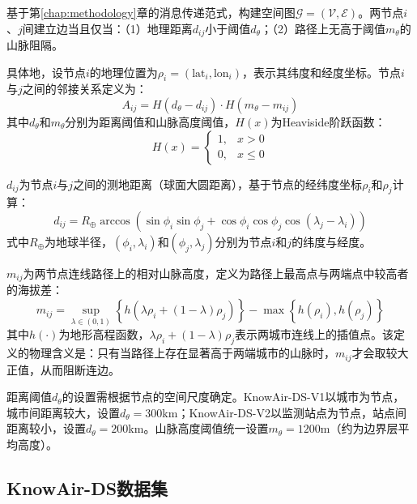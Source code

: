 基于第\ref{chap:methodology}章的消息传递范式，构建空间图$\mathcal{G} = (\mathcal{V}, \mathcal{E})$。两节点$i$、$j$间建立边当且仅当：（1）地理距离$d_{ij}$小于阈值$d_\theta$；（2）路径上无高于阈值$m_\theta$的山脉阻隔。

具体地，设节点$i$的地理位置为$\rho_i = (\text{lat}_i, \text{lon}_i)$，表示其纬度和经度坐标。节点$i$与$j$之间的邻接关系定义为：
\begin{equation}
    A_{ij} = H(d_\theta - d_{ij}) \cdot H(m_\theta - m_{ij})
\label{eq:adjacency}
\end{equation}
\noindent 其中$d_\theta$和$m_\theta$分别为距离阈值和山脉高度阈值，$H(x)$为Heaviside阶跃函数：
\begin{equation}
    H(x) = \begin{cases} 1, & x > 0 \\ 0, & x \leq 0 \end{cases}
\label{eq:heaviside}
\end{equation}

\noindent $d_{ij}$为节点$i$与$j$之间的测地距离（球面大圆距离），基于节点的经纬度坐标$\rho_i$和$\rho_j$计算：
\begin{equation}
    d_{ij} = R_{\oplus} \arccos\left(\sin\phi_i \sin\phi_j + \cos\phi_i \cos\phi_j \cos(\lambda_j - \lambda_i)\right)
\label{eq:distance}
\end{equation}
\noindent 式中$R_{\oplus}$为地球半径，$(\phi_i, \lambda_i)$和$(\phi_j, \lambda_j)$分别为节点$i$和$j$的纬度与经度。

\noindent $m_{ij}$为两节点连线路径上的相对山脉高度，定义为路径上最高点与两端点中较高者的海拔差：
\begin{equation}
    m_{ij} = \sup_{\lambda \in (0,1)} \left\{ h\left(\lambda\rho_i + (1-\lambda)\rho_j\right) \right\} - \max\left\{h(\rho_i), h(\rho_j)\right\}
\label{eq:mountain}
\end{equation}
\noindent 其中$h(\cdot)$为地形高程函数，$\lambda\rho_i + (1-\lambda)\rho_j$表示两城市连线上的插值点。该定义的物理含义是：只有当路径上存在显著高于两端城市的山脉时，$m_{ij}$才会取较大正值，从而阻断连边。

距离阈值$d_\theta$的设置需根据节点的空间尺度确定。KnowAir-DS-V1以城市为节点，城市间距离较大，设置$d_\theta = 300$km；KnowAir-DS-V2以监测站点为节点，站点间距离较小，设置$d_\theta = 200$km。山脉高度阈值统一设置$m_\theta = 1200$m（约为边界层平均高度）。


\subsection{KnowAir-DS数据集}
\label{subsec:knowair_dataset}

